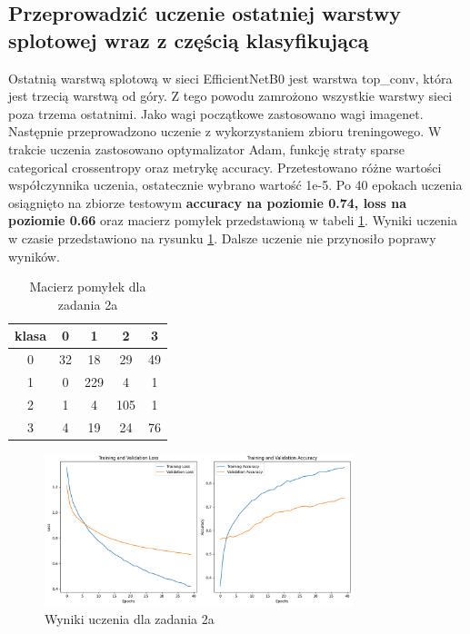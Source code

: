 \subsection{Przeprowadzić uczenie ostatniej warstwy splotowej wraz z częścią
klasyfikującą}

Ostatnią warstwą splotową w sieci EfficientNetB0 jest warstwa top\_conv, która jest trzecią warstwą od góry. Z tego powodu zamrożono wszystkie warstwy sieci poza trzema ostatnimi. Jako wagi początkowe zastosowano wagi imagenet. Następnie przeprowadzono uczenie z wykorzystaniem zbioru treningowego. W trakcie uczenia zastosowano optymalizator Adam, funkcję straty sparse categorical crossentropy oraz metrykę accuracy. Przetestowano różne wartości współczynnika uczenia, ostatecznie wybrano wartość 1e-5. Po 40 epokach uczenia osiągnięto na zbiorze testowym \textbf{accuracy na poziomie 0.74, loss na poziomie 0.66} oraz macierz pomyłek przedstawioną w tabeli \ref{tab:z2a}. Wyniki uczenia w czasie przedstawiono na rysunku \ref{fig:z2a}. Dalsze uczenie nie przynosiło poprawy wyników.


\begin{table}[H]
\centering
\begin{tabular}{|c|c|c|c|c|}
\hline
klasa & 0 & 1 & 2 & 3 \\ \hline
0 & 32 & 18 & 29 & 49 \\ \hline
1 & 0 & 229 & 4 & 1 \\ \hline
2 & 1 & 4 & 105 & 1 \\ \hline
3 & 4 & 19 & 24 & 76 \\ \hline
\end{tabular}
\caption{Macierz pomyłek dla zadania 2a}
\label{tab:z2a}
\end{table}

\begin{figure}[H]
    \centering
    \includegraphics[width=0.8\textwidth]{img/z2a.png}
    \caption{Wyniki uczenia dla zadania 2a}
    \label{fig:z2a}
\end{figure}




